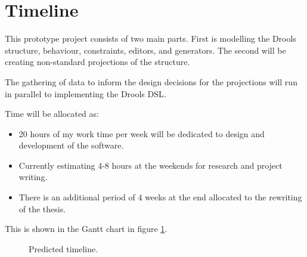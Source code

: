 \section{Timeline}

This prototype project consists of two main parts.
First is modelling the Drools structure, behaviour, constraints, editors, and generators.
The second will be creating non-standard projections of the structure.

The gathering of data to inform the design decisions for the projections will run in parallel to implementing the Drools DSL.

Time will be allocated as:
\begin{itemize}
    \item 20 hours of my work time per week will be dedicated to design and development of the software.
    \item Currently estimating 4-8 hours at the weekends for research and project writing.
    \item There is an additional period of 4 weeks at the end allocated to the rewriting of the thesis.
\end{itemize}

This is shown in the Gantt chart in figure \ref{fig:ganttchart}.

\begin{figure}[H]
    \centering
    \caption{Predicted timeline.}
    \label{fig:ganttchart}
\end{figure}
